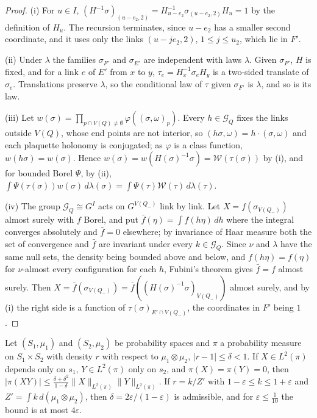 \begin{proof}
(i) For $u\in I$, $(H^{-1}\sigma)_{(u-e_2,2)}=H_{u-e_2}^{-1}\sigma_{(u-e_2,2)}
H_u=1$ by the definition of $H_u$. The recursion terminates, since $u-e_2$ has
a smaller second coordinate, and it uses only the links $(u-je_2,2)$, $1\le j
\le u_2$, which lie in $F'$.

(ii) Under $\lambda$ the families $\sigma_{F'}$ and $\sigma_{E'}$ are
independent with laws $\lambda$. Given $\sigma_{F'}$, $H$ is fixed, and for a
link $e$ of $E'$ from $x$ to $y$, $\tau_e=H_x^{-1}\sigma_eH_y$ is a two-sided
translate of $\sigma_e$. Translations preserve $\lambda$, so the conditional
law of $\tau$ given $\sigma_{F'}$ is $\lambda$, and so is its law.

(iii) Let $w(\sigma)=\prod_{p\cap V(Q)\ne\emptyset}\varphi((\sigma,\omega)_p)$.
Every $h\in\mathcal G_Q$ fixes the links outside $V(Q)$, whose end points are
not interior, so $(h\sigma,\omega)=h\cdot(\sigma,\omega)$ and each plaquette
holonomy is conjugated; as $\varphi$ is a class function, $w(h\sigma)=
w(\sigma)$. Hence $w(\sigma)=w(H(\sigma)^{-1}\sigma)=\mathcal W(\tau(\sigma))$
by (i), and for bounded Borel $\Psi$, by (ii), $\int\Psi(\tau(\sigma))
w(\sigma)\,d\lambda(\sigma)=\int\Psi(\tau)\mathcal W(\tau)\,d\lambda(\tau)$.

(iv) The group $\mathcal G_Q\cong G^I$ acts on $G^{V(Q_-)}$ link by link. Let
$X=f(\sigma_{V(Q_-)})$ almost surely with $f$ Borel, and put $\bar f(\eta)=
\int f(h\eta)\,dh$ where the integral converges absolutely and $\bar f=0$
elsewhere; by invariance of Haar measure both the set of convergence and $\bar f$
are invariant under every $k\in\mathcal G_Q$. Since $\nu$ and $\lambda$ have the
same null sets, the density being bounded above and below, and $f(h\eta)=
f(\eta)$ for $\nu$-almost every configuration for each $h$, Fubini's theorem
gives $\bar f=f$ almost surely. Then $X=\bar f(\sigma_{V(Q_-)})=\bar f((H(
\sigma)^{-1}\sigma)_{V(Q_-)})$ almost surely, and by (i) the right side is a
function of $\tau(\sigma)_{E'\cap V(Q_-)}$, the coordinates in $F'$ being $1$.
\end{proof}

\begin{lemma}\label{lem:nearproduct}
Let $(S_1,\mu_1)$ and $(S_2,\mu_2)$ be probability spaces and $\pi$ a
probability measure on $S_1\times S_2$ with density $r$ with respect to
$\mu_1\otimes\mu_2$, $|r-1|\le\delta<1$. If $X\in L^2(\pi)$ depends only on
$s_1$, $Y\in L^2(\pi)$ only on $s_2$, and $\pi(X)=\pi(Y)=0$, then $|\pi(XY)|\le
\frac{\delta+\delta^2}{1-\delta}\|X\|_{L^2(\pi)}\|Y\|_{L^2(\pi)}$. If $r=k/Z'$
with $1-\varepsilon\le k\le1+\varepsilon$ and $Z'=\int k\,d(\mu_1\otimes\mu_2)$,
then $\delta=2\varepsilon/(1-\varepsilon)$ is admissible, and for $\varepsilon\le
\frac1{10}$ the bound is at most $4\varepsilon$.
\end{lemma}

